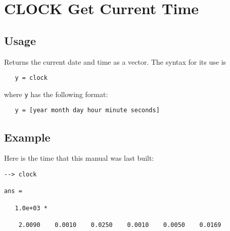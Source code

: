 \section{CLOCK Get Current Time}

\subsection{Usage}

Returns the current date and time as a vector.  The syntax for its use is
\begin{verbatim}
   y = clock
\end{verbatim}
where \verb|y| has the following format:
\begin{verbatim}
   y = [year month day hour minute seconds]
\end{verbatim}
\subsection{Example}

Here is the time that this manual was last built:
\begin{verbatim}
--> clock

ans = 

   1.0e+03 * 

    2.0090    0.0010    0.0250    0.0010    0.0050    0.0169 
\end{verbatim}
